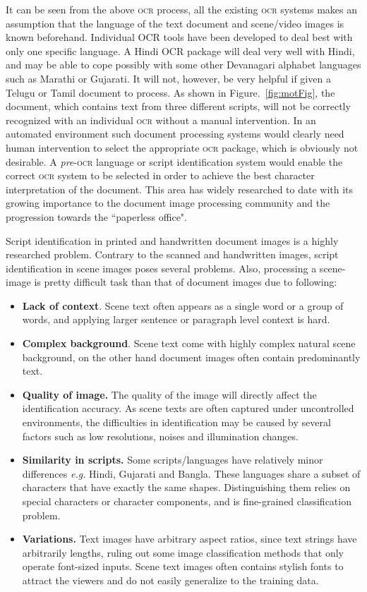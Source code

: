 It can be seen from the above \textsc{ocr} process, all the existing \textsc{ocr} systems makes an assumption that the language of the text document and scene/video images is known beforehand.  Individual OCR tools have been developed to deal best with only one specific language. A Hindi OCR package will deal very well with Hindi, and may be able to cope possibly with some other Devanagari alphabet languages such as Marathi or Gujarati. It will not, however, be very helpful if given a Telugu or Tamil document to process. As shown in Figure.~\ref{fig:motFig}, the document, which contains text from three different scripts, will not be correctly recognized with an individual \textsc{ocr} without a manual intervention. In an automated environment such document processing systems would clearly need human intervention to select the appropriate \textsc{ocr} package, which is obviously not desirable. A \textit{pre}-\textsc{ocr} language or script identification system would enable the correct \textsc{ocr} system to be selected in order to achieve the best character interpretation of the document. This area has widely researched to date with its growing importance to the document image processing community and the progression towards the ``paperless office".

Script identification in printed and handwritten document images is a highly researched problem. Contrary to the scanned and handwritten images, script identification in scene images poses several problems. Also, processing a scene-image is pretty difficult task than that of document images due to following:

\begin{itemize}
\item \textbf{Lack of context}. Scene text often appears as a single word or a group of words, and applying larger sentence or paragraph level context is hard. 
\item \textbf{Complex background}. Scene text come with highly complex natural scene background, on
the other hand document images often contain predominantly text.
\item \textbf{Quality of image.} The quality of the image will directly affect the identification accuracy. As scene texts are often captured under uncontrolled environments, the difficulties in identification may be caused by several factors such as low resolutions, noises and illumination changes.
\item \textbf{Similarity in scripts.} Some scripts/languages have relatively minor differences \textit{e.g.} Hindi, Gujarati and Bangla. These languages share a subset of characters that have exactly the same shapes. Distinguishing them relies on special characters or character components, and is fine-grained classification problem.
\item \textbf{Variations.} Text images have arbitrary aspect ratios, since text strings have arbitrarily lengths, ruling out some image classification methods that only operate font-sized inputs. Scene text images often contains stylish fonts to attract the viewers and do not easily generalize to the training data.
\end{itemize}

